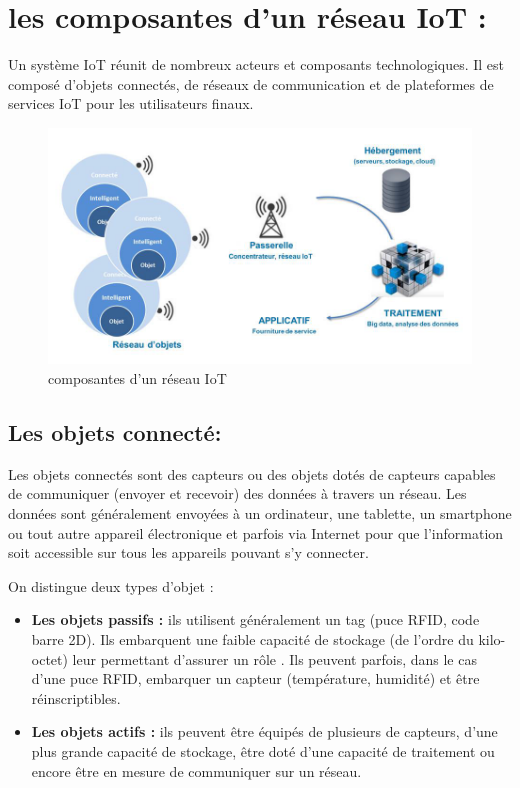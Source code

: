 \section{les composantes d'un réseau IoT :}

Un système IoT réunit de nombreux acteurs et composants technologiques. Il est composé d'objets connectés, de réseaux de communication et de plateformes de services IoT pour les utilisateurs finaux.

\begin{figure}[h]
	\centering
    \includegraphics[scale=0.5]{img/part1/2.2}
    \caption{composantes d'un réseau IoT}
\end{figure}

\subsection{Les objets connecté:}
Les objets connectés sont des capteurs ou des objets dotés de capteurs capables de communiquer (envoyer et recevoir) des données à travers un réseau. Les données sont généralement envoyées à un ordinateur, une tablette, un smartphone ou tout autre appareil électronique et parfois via Internet pour que l’information soit accessible sur tous les appareils pouvant s’y connecter.

On distingue deux types d’objet :
\begin{itemize}[label=\textbullet]
\item \textbf{Les objets passifs :} ils utilisent généralement un tag (puce RFID, code barre 2D). Ils embarquent une faible capacité de stockage (de l’ordre du kilo-octet) leur permettant d’assurer un rôle . Ils peuvent parfois, dans le cas d’une puce RFID, embarquer un capteur (température, humidité) et être réinscriptibles.
\item \textbf{Les objets actifs :} ils peuvent être équipés de plusieurs de capteurs, d’une plus grande capacité de stockage, être doté d’une capacité de traitement ou encore être en mesure de communiquer sur un réseau.
\end{itemize}

